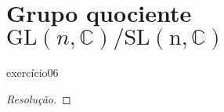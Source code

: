 \section[Grupo quociente GL(n, C)/SL(n, C)]{Grupo quociente \(\mathrm{GL}(n, \mathbb{C})/\mathrm{SL(n, \mathbb{C})}\)}
\begin{exercício}{}{exercício06}

\end{exercício}
\begin{proof}[Resolução]

\end{proof}
